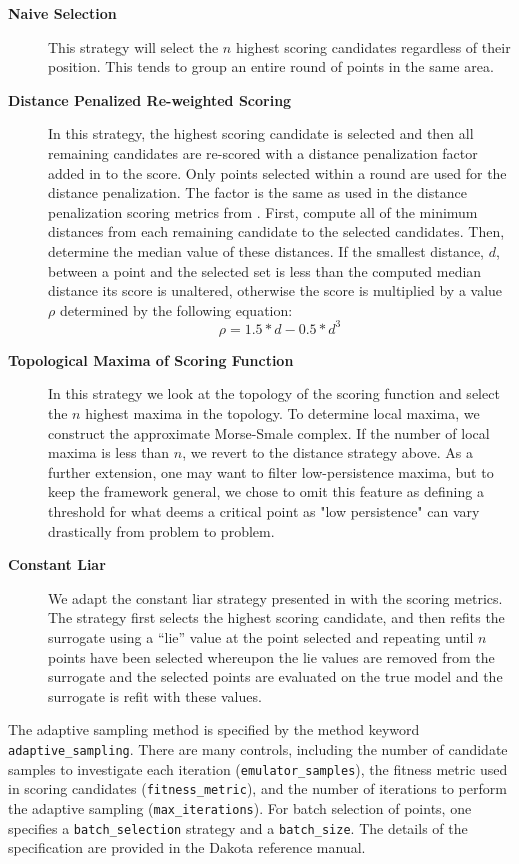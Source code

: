 \begin{description}
\item[\bf Naive Selection]  
This strategy will select the $n$ highest scoring candidates regardless of their
position. This tends to group an entire round of points in the same area.
\item[\bf Distance Penalized Re-weighted Scoring] 
In this strategy, the highest 
scoring candidate is selected and then all
remaining candidates are re-scored with a distance penalization factor added in
to the score. Only points selected within a round are used for the distance
penalization. The factor is the same as used in the distance penalization
 scoring metrics from \cite{Maljovec}. First, compute all of the minimum
distances from each remaining candidate to the selected candidates. Then,
determine the median value of these distances. If the smallest distance, $d$,
between a point and the selected set is less than the computed median distance
its score is unaltered, otherwise the score is multiplied by a value $\rho$
determined by the following equation:
\begin{equation}
\rho = 1.5*d - 0.5*d^3
\end{equation}
\item[\bf Topological Maxima of Scoring Function]  
In this strategy we look at the topology of the scoring function and select the
$n$ highest maxima in the topology. To determine local maxima, we construct the
approximate Morse-Smale complex. If the number of local maxima is less than $n$,
 we revert to the distance strategy above. As a further extension, one may
want to filter low-persistence maxima, but to keep the framework general, we
chose to omit this feature as defining a threshold for what deems a critical
point as "low persistence" can vary drastically from problem to problem.
\item[\bf Constant Liar]  
We adapt the constant liar strategy presented in \cite{Ginsbourger} with the
scoring metrics. The strategy first selects
the highest scoring candidate, and then refits the surrogate using a ``lie'' value
at the point selected and repeating until $n$ points have been selected
whereupon the lie values are removed from the surrogate and the selected points
are evaluated on the true model and the surrogate is refit with these values.
\end{description}

The adaptive sampling method is specified by the method keyword 
\texttt{adaptive\_sampling}. There are many controls, including 
the number of candidate samples to investigate each iteration 
(\texttt{emulator\_samples}), the fitness metric used in scoring 
candidates (\texttt{fitness\_metric}), and the number of iterations 
to perform the adaptive sampling (\texttt{max\_iterations}). 
For batch selection of points, one specifies a \texttt{batch\_selection} 
strategy and a \texttt{batch\_size}. 
The details of the specification are provided in the Dakota 
reference manual. 

